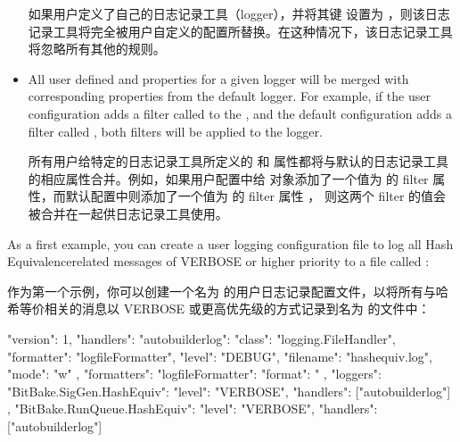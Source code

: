 \begin{itemize}
\medskip
如果用户定义了自己的日志记录工具（logger），并将其键  设置为 ，则该日志记录工具将完全被用户自定义的配置所替换。在这种情况下，该日志记录工具将忽略所有其他的规则。

\item All user defined  and  properties for a given logger will be merged with corresponding properties from the default logger. For example, if the user configuration adds a filter called  to the , and the default configuration adds a filter called , both filters will be applied to the logger.

\medskip
所有用户给特定的日志记录工具所定义的  和  属性都将与默认的日志记录工具的相应属性合并。例如，如果用户配置中给 对象添加了一个值为  的 filter 属性，而默认配置中则添加了一个值为  的 filter 属性 ， 则这两个 filter 的值会被合并在一起供日志记录工具使用。
\end{itemize}


As a first example, you can create a  user logging configuration file to log all Hash Equivalence\footnotemark[1] related messages of VERBOSE or higher priority to a file called :


作为第一个示例，你可以创建一个名为  的用户日志记录配置文件，以将所有与哈希等价\footnotemark[1]相关的消息以 VERBOSE 或更高优先级的方式记录到名为  的文件中：



\begin{pyglist}
{
    "version": 1,
    "handlers": {
        "autobuilderlog": {
            "class": "logging.FileHandler",
            "formatter": "logfileFormatter",
            "level": "DEBUG",
            "filename": "hashequiv.log",
            "mode": "w"
        }
    },
    "formatters": {
            "logfileFormatter": {
                "format": "%
            }
    },
    "loggers": {
        "BitBake.SigGen.HashEquiv": {
            "level": "VERBOSE",
            "handlers": ["autobuilderlog"]
        },
        "BitBake.RunQueue.HashEquiv": {
            "level": "VERBOSE",
            "handlers": ["autobuilderlog"]
        }
    }
}
\end{pyglist}

